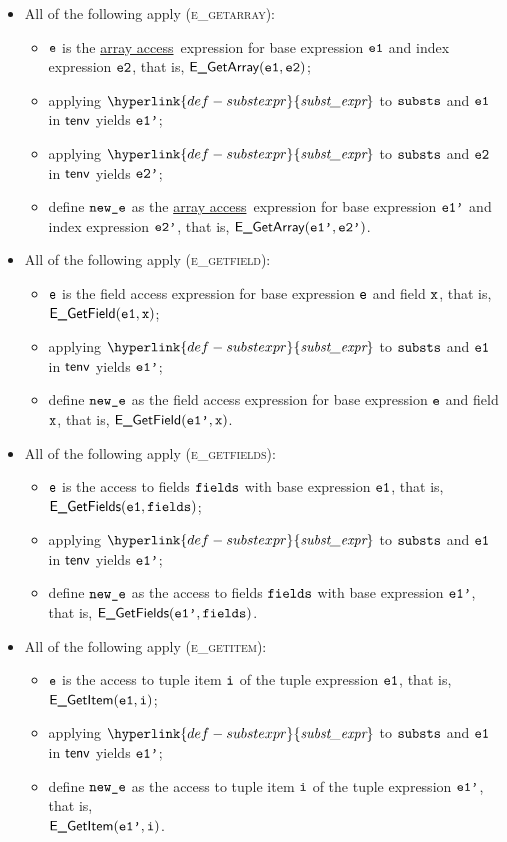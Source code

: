 \documentclass{book}
\newcommand\substexpr[0]{\hyperlink{def-substexpr}{\textfunc{subst\_expr}}}
\newcommand\arrayaccess[0]{\hyperlink{def-arrayaccess}{array access}}
\begin{document}
\begin{itemize}
  \item All of the following apply (\textsc{e\_getarray}):
  \begin{itemize}
    \item $\texttt{e}$ is the \arrayaccess\ expression for base expression $\texttt{e1}$ and index expression $\texttt{e2}$,
          that is, $\textsf{E\_GetArray}(\texttt{e1}, \texttt{e2})$;
    \item applying $\substexpr$ to $\texttt{substs}$ and $\texttt{e1}$ in $\textsf{tenv}$ yields $\texttt{e1'}$;
    \item applying $\substexpr$ to $\texttt{substs}$ and $\texttt{e2}$ in $\textsf{tenv}$ yields $\texttt{e2'}$;
    \item define $\texttt{new\_e}$ as the \arrayaccess\ expression for base expression $\texttt{e1'}$ and index expression $\texttt{e2'}$,
    that is, $\textsf{E\_GetArray}(\texttt{e1'}, \texttt{e2'})$.
  \end{itemize}

  \item All of the following apply (\textsc{e\_getfield}):
  \begin{itemize}
    \item $\texttt{e}$ is the field access expression for base expression $\texttt{e}$ and field $\texttt{x}$,
          that is, $\textsf{E\_GetField}(\texttt{e1}, \texttt{x})$;
    \item applying $\substexpr$ to $\texttt{substs}$ and $\texttt{e1}$ in $\textsf{tenv}$ yields $\texttt{e1'}$;
    \item define $\texttt{new\_e}$ as the field access expression for base expression $\texttt{e}$ and field $\texttt{x}$,
          that is, $\textsf{E\_GetField}(\texttt{e1'}, \texttt{x})$.
  \end{itemize}

  \item All of the following apply (\textsc{e\_getfields}):
  \begin{itemize}
    \item $\texttt{e}$ is the access to fields $\texttt{fields}$ with base expression $\texttt{e1}$, that is, \\
          $\textsf{E\_GetFields}(\texttt{e1}, \texttt{fields})$;
    \item applying $\substexpr$ to $\texttt{substs}$ and $\texttt{e1}$ in $\textsf{tenv}$ yields $\texttt{e1'}$;
    \item define $\texttt{new\_e}$ as the access to fields $\texttt{fields}$ with base expression $\texttt{e1'}$, that is, $\textsf{E\_GetFields}(\texttt{e1'}, \texttt{fields})$.
  \end{itemize}

  \item All of the following apply (\textsc{e\_getitem}):
  \begin{itemize}
    \item $\texttt{e}$ is the access to tuple item $\texttt{i}$ of the tuple expression $\texttt{e1}$, that is, \\
          $\textsf{E\_GetItem}(\texttt{e1}, \texttt{i})$;
    \item applying $\substexpr$ to $\texttt{substs}$ and $\texttt{e1}$ in $\textsf{tenv}$ yields $\texttt{e1'}$;
    \item define $\texttt{new\_e}$ as the access to tuple item $\texttt{i}$ of the tuple expression $\texttt{e1'}$, that is, \\
          $\textsf{E\_GetItem}(\texttt{e1'}, \texttt{i})$.
  \end{itemize}


\end{itemize}
\end{document}
